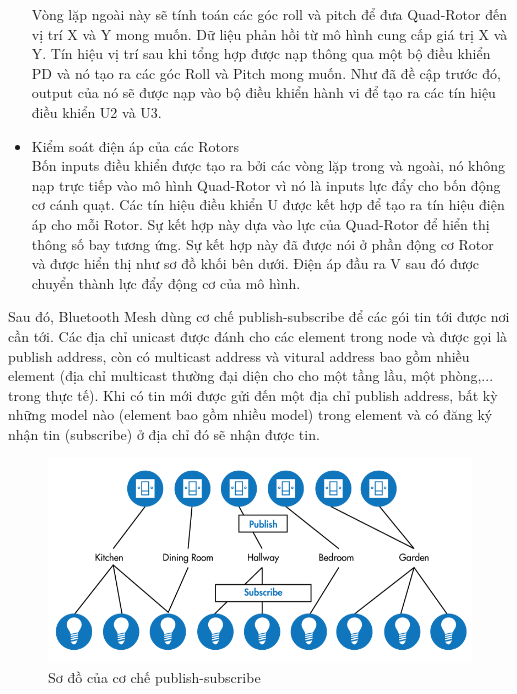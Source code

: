 \begin{itemize}
		Vòng lặp ngoài này sẽ tính toán các góc roll và pitch để đưa Quad-Rotor đến vị trí X và Y mong muốn. Dữ liệu phản hồi từ mô hình cung cấp giá trị X và Y. Tín hiệu vị trí sau khi tổng hợp được nạp thông qua một bộ điều khiển PD và nó tạo ra các góc Roll và Pitch mong muốn. Như đã đề cập trước đó, output của nó sẽ được nạp vào bộ điều khiển hành vi để tạo ra các tín hiệu điều khiển U2 và U3.
\\
			\item Kiểm soát điện áp của các Rotors
			\\
			Bốn inputs điều khiển được tạo ra bởi các vòng lặp trong và ngoài, nó không nạp trực tiếp vào mô hình Quad-Rotor vì nó là inputs lực đẩy cho bốn động cơ cánh quạt. Các tín hiệu điều khiển U được kết hợp để tạo ra tín hiệu điện áp cho mỗi Rotor. Sự kết hợp này dựa vào lực của Quad-Rotor để hiển thị thông số bay tương ứng. Sự kết hợp này đã được nói ở phần động cơ Rotor và được hiển thị như sơ đồ khối bên dưới. Điện áp đầu ra V sau đó được chuyển thành lực đẩy động cơ của mô hình.
  
			\end{itemize}
            Sau đó, Bluetooth Mesh dùng cơ chế publish-subscribe để các gói tin tới được nơi cần tới. Các địa chỉ unicast được đánh cho các element trong node và được gọi là publish address, còn có multicast address và vitural address bao gồm nhiều element (địa chỉ multicast thường đại diện cho cho một tầng lầu, một phòng,... trong thực tế). Khi có tin mới được gửi đến một địa chỉ publish address, bất kỳ những model nào (element bao gồm nhiều model) trong element và có đăng ký nhận tin (subscribe) ở địa chỉ đó sẽ nhận được tin.
        
            \begin{figure}[h!]
        	    \begin{center}
        		    \includegraphics[scale=0.5]{images/mesh-pub-sub.png}
        		    \caption{Sơ đồ của cơ chế publish-subscribe}
        	    \end{center}
            \end{figure}
